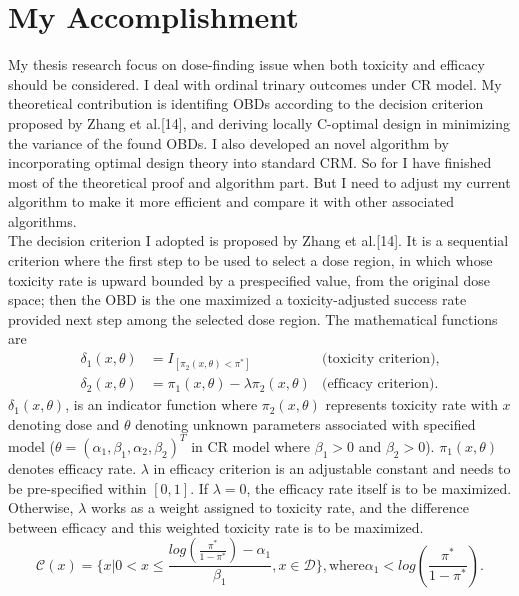 \documentclass[12pt]{article}
\begin{document}
\section{My Accomplishment}
My thesis research focus on dose-finding issue when both toxicity and efficacy should be considered. I deal with ordinal trinary outcomes under CR model. My theoretical contribution is identifing OBDs according to the decision criterion proposed by Zhang et al.[14], and deriving locally C-optimal design in minimizing the variance of the found OBDs. I also developed an novel algorithm by incorporating optimal design theory into standard CRM. So for I have finished most of the theoretical proof and algorithm part. But I need to adjust my current algorithm to make it more efficient and compare it with other associated algorithms.\\
 The decision criterion I adopted is proposed by Zhang et al.[14]. It is a sequential criterion where the first step to be used to select a dose region, in which whose toxicity rate is upward bounded by a prespecified value, from the original dose space; then the OBD is the one maximized a toxicity-adjusted success rate provided next step among the selected dose region. The mathematical functions are
\begin{equation}
\begin{array}{rlr}
\delta_1(x, \theta)&=I_{[\pi_2(x,\theta)<\pi^*]}& \mbox{(toxicity criterion)},\\
\delta_2(x, \theta)&=\pi_1(x,\theta)-\lambda \pi_2(x,\theta)& \mbox{(efficacy criterion)}.
\end{array}
\end{equation}
 $\delta_1(x,\theta)$, is an indicator function where $\pi_2(x,\theta)$ represents toxicity rate with $x$ denoting dose and $\theta$ denoting unknown parameters associated with specified model ($\theta=(\alpha_1, \beta_1, \alpha_2, \beta_2)^T$ in CR model where $\beta_1>0$ and $\beta_2>0$). $\pi_1(x,\theta)$ denotes efficacy rate. $\lambda$ in efficacy criterion is an adjustable constant and needs to be pre-specified within $[0, 1]$. If $\lambda=0$, the efficacy rate itself is to be maximized. Otherwise, $\lambda$ works as a weight assigned to toxicity rate, and the difference between efficacy and this weighted toxicity rate is to be maximized.
\begin{equation}
    \mathcal{C}(x)=\{x| 0< x\le \frac{log(\frac{\pi^*}{1-\pi^*})-\alpha_1}{\beta_1}, x \in \mathcal{D} \}, \mbox{where}  \alpha_1 < log\left(\frac{\pi^*}{1-\pi^*}\right).
\end{equation}
\end{document}
